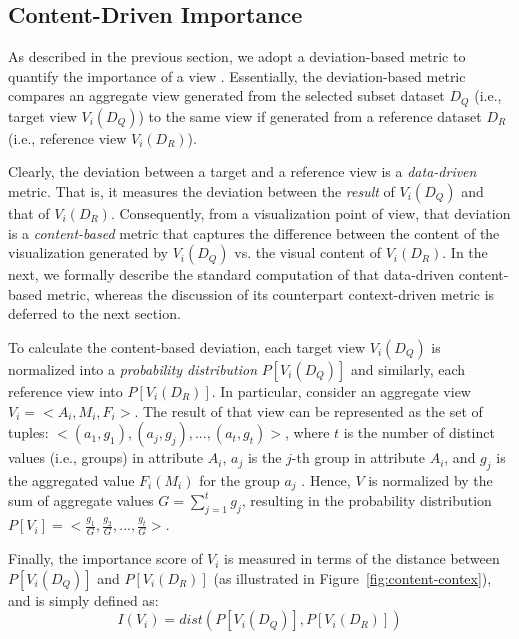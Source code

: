 \subsection{Content-Driven Importance}
\label{subsec:content_driven_deviation}

As  described in the previous section, we adopt a deviation-based metric to quantify the importance of a view \cite{Vartak2015,Vartak2014}. 
%
Essentially, the deviation-based metric compares an aggregate view generated from the selected subset dataset $D_Q$ (i.e., target view $V_i(D_Q)$) to the same view if generated from a reference dataset $D_R$ (i.e., reference view $V_i(D_R)$). 
%
%

Clearly, the deviation between a target and a reference view is a {\em data-driven} metric. 
%
That is, it measures the deviation between the {\em result} of $V_i(D_Q)$ and that of $V_i(D_R)$. 
%
Consequently, from a visualization point of view, that deviation is a {\em content-based} metric that captures the difference between the content of the visualization generated by $V_i(D_Q)$ vs. the visual content of  $V_i(D_R)$.
%
In the next, we formally describe the standard computation of that data-driven content-based metric, whereas the discussion of its counterpart context-driven metric is deferred to the next section.

To calculate the content-based deviation, each target view $V_i(D_Q)$ is normalized into a {\em probability distribution} $P[V_i(D_Q)]$ and similarly, each reference view into $P[V_i(D_R)]$.
%
In particular, consider an aggregate view $V_i=<\!A_i,M_i,F_i\!>$. 
%
The result of that view can be represented as the set of tuples: $<\!(a_1, g_1), (a_j, g_j), ..., (a_t, g_t)\!>$, where $t$ is the number of distinct values (i.e., groups) in attribute $A_i$, $a_j$ is the $j$-th group in attribute $A_i$, and $g_j$ is the aggregated value $F_i(M_i)$ for the group $a_j$ \cite{Ehsan2016, Vartak2015}. 
%
Hence, $V$ is normalized by the sum of aggregate values $G=\sum\limits_{j=1}^{t} g_j$, resulting in the probability distribution $P[V_i] = <\!\frac{g_1}{G}, \frac{g_2}{G}, ..., \frac{g_t}{G}\!>$.
%

Finally, the importance score of $V_i$ is measured in terms of the distance between $P[V_i(D_Q)]$ and $P[V_i(D_R)]$ (as illustrated in Figure~\ref{fig:content-contex}), and is simply defined as:
\begin{equation}
	I\left(V_i\right) = dist\left(P\left[V_i(D_Q)\right], P\left[V_i(D_R)\right]\right)
	\label{importance_score}
\end{equation}

